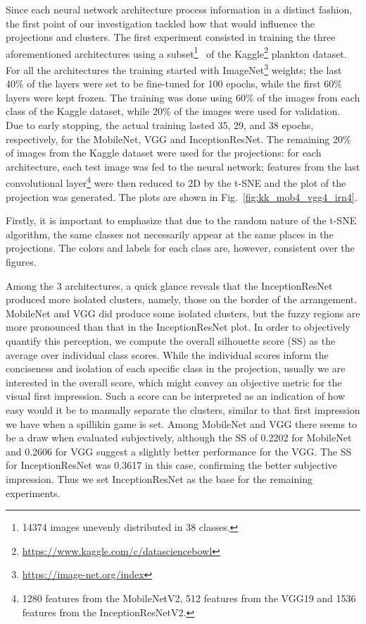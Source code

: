 \documentclass[sn-basic]{sn-jnl}%
\theoremstyle{thmstyleone}%
\theoremstyle{thmstyletwo}%
\theoremstyle{thmstylethree}%
\begin{document}
Since each neural network architecture process information in a distinct fashion, the first point of our investigation tackled how that would influence the projections and clusters. The first experiment consisted in training the three aforementioned architectures using a subset\footnote{14374 images unevenly distributed in 38 classes.}~\citep{zheng-paper-kaggle} of the Kaggle\footnote{\url{https://www.kaggle.com/c/datasciencebowl}} plankton dataset. For all the architectures the training started with ImageNet\footnote{\url{https://image-net.org/index}} weights; the last 40\% of the layers were set to be fine-tuned for 100 epochs, while the first 60\% layers were kept frozen. The training was done using 60\% of the images from each class of the Kaggle dataset, while 20\% of the images were used for validation. Due to early stopping, the actual training lasted 35, 29, and 38 epochs, respectively, for the MobileNet, VGG and InceptionResNet. The remaining 20\% of images from the Kaggle dataset were used for the projections: for each architecture, each test image was fed to the neural network; features 
from the last convolutional layer\footnote{1280 features from the MobileNetV2, 512 features from the VGG19 and 1536 features from the InceptionResNetV2.} were then reduced to 2D by the t-SNE and the plot of the projection was generated. The plots are shown in Fig.~\ref{fig:kk_mob4_vgg4_irn4}.

Firstly, it is important to emphasize that due to the random nature of the t-SNE algorithm, the same classes not necessarily appear at the same places in the projections. The colors and labels for each class are, however, consistent over the figures.

Among the 3 architectures, a quick glance reveals that the InceptionResNet produced more isolated clusters, namely, those on the border of the arrangement. MobileNet and VGG did produce some isolated clusters, but the fuzzy regions are more pronounced than that in the InceptionResNet plot. In order to objectively quantify this perception, we compute the overall silhouette score (SS) as the average over individual class scores. While the individual scores inform the conciseness and isolation of each specific class in the projection, usually we are interested in the overall score, which might convey an objective metric for the visual first impression. Such a score can be interpreted as an indication of how easy would it be to manually separate the clusters, similar to that first impression we have when a spillikin game is set. Among MobileNet and VGG there seems to be a draw when evaluated subjectively, although the SS of 0.2202 for MobileNet and 0.2606 for VGG suggest a slightly better performance for the VGG. The SS for InceptionResNet was 0.3617 in this case, confirming the better subjective impression. Thus we set InceptionResNet as the base for the remaining experiments.
\end{document}
